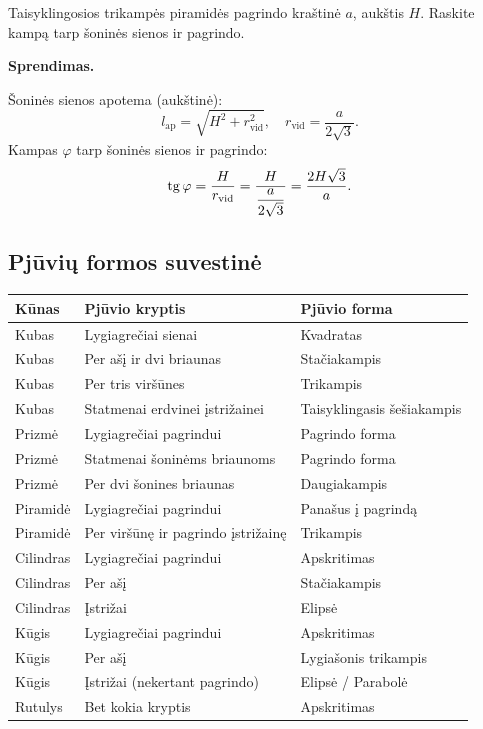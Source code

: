 \begin{example}
Taisyklingosios trikampės piramidės pagrindo kraštinė $a$, aukštis $H$. Raskite kampą tarp šoninės sienos ir pagrindo.

\textbf{Sprendimas.}

Šoninės sienos apotema (aukštinė):
\[
l_{\text{ap}} = \sqrt{H^2 + r_{\text{vid}}^2}, \quad r_{\text{vid}} = \frac{a}{2\sqrt{3}}.
\]
Kampas $\varphi$ tarp šoninės sienos ir pagrindo:
\[
\operatorname{tg}\varphi = \frac{H}{r_{\text{vid}}} = \frac{H}{\dfrac{a}{2\sqrt{3}}} = \frac{2H\sqrt{3}}{a}.
\]
\end{example}

\subsection{Pjūvių formos suvestinė}

\begin{center}
\begin{tabular}{|l|l|l|}
\hline
\textbf{Kūnas} & \textbf{Pjūvio kryptis} & \textbf{Pjūvio forma} \\
\hline
Kubas & Lygiagrečiai sienai & Kvadratas \\
Kubas & Per ašį ir dvi briaunas & Stačiakampis \\
Kubas & Per tris viršūnes & Trikampis \\
Kubas & Statmenai erdvinei įstrižainei & Taisyklingasis šešiakampis \\
\hline
Prizmė & Lygiagrečiai pagrindui & Pagrindo forma \\
Prizmė & Statmenai šoninėms briaunoms & Pagrindo forma \\
Prizmė & Per dvi šonines briaunas & Daugiakampis \\
\hline
Piramidė & Lygiagrečiai pagrindui & Panašus į pagrindą \\
Piramidė & Per viršūnę ir pagrindo įstrižainę & Trikampis \\
\hline
Cilindras & Lygiagrečiai pagrindui & Apskritimas \\
Cilindras & Per ašį & Stačiakampis \\
Cilindras & Įstrižai & Elipsė \\
\hline
Kūgis & Lygiagrečiai pagrindui & Apskritimas \\
Kūgis & Per ašį & Lygiašonis trikampis \\
Kūgis & Įstrižai (nekertant pagrindo) & Elipsė / Parabolė \\
\hline
Rutulys & Bet kokia kryptis & Apskritimas \\
\hline
\end{tabular}
\end{center}

